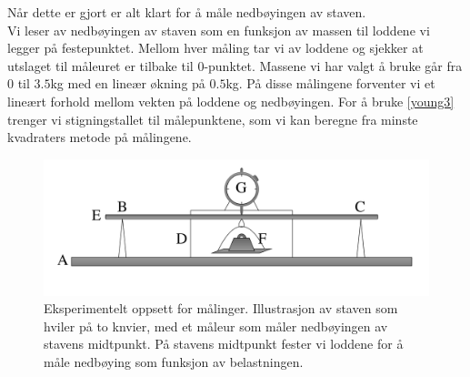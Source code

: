 \documentclass[%
 reprint,
 amsmath,amssymb,
 aps,
 norsk,
 booktabs
]{revtex4-1}
\begin{document}
Når dette er gjort er alt klart for å måle nedbøyingen av staven.\\
Vi leser av nedbøyingen av staven som en funksjon av massen til loddene vi legger på festepunktet. Mellom hver måling tar vi av loddene og sjekker at utslaget til måleuret er tilbake til $0$-punktet. Massene vi har valgt å bruke går fra $0$ til $3.5$kg med en lineær økning på $0.5$kg. På disse målingene forventer vi et lineært forhold mellom vekten på loddene og nedbøyingen. For å bruke \eqref{young3} trenger vi stigningstallet til målepunktene, som vi kan beregne fra minste kvadraters metode på målingene. \\
\begin{figure}
  \centering
  \includegraphics[scale=0.17]{oppsett.png}
  \caption{Eksperimentelt oppsett for målinger. Illustrasjon av staven som hviler på to knvier, med et måleur som måler nedbøyingen av stavens midtpunkt. På stavens midtpunkt fester vi loddene for å måle nedbøying som funksjon av belastningen.}
  \label{eksperiment}
\end{figure}
\end{document}
